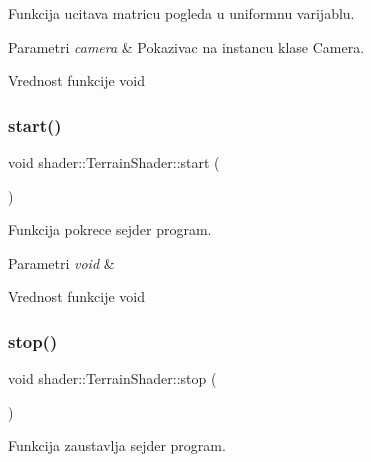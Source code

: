 Funkcija ucitava matricu pogleda u uniformnu varijablu. 


\begin{DoxyParams}{Parametri}
{\em camera} & Pokazivac na instancu klase Camera. \\
\hline
\end{DoxyParams}
\begin{DoxyReturn}{Vrednost funkcije}
void 
\end{DoxyReturn}
\mbox{\label{classshader_1_1TerrainShader_a1a198e23fea4d47a75bf7c1c90216d18}} 
\subsubsection{\texorpdfstring{start()}{start()}}
{\footnotesize\ttfamily void shader\+::\+Terrain\+Shader\+::start (\begin{DoxyParamCaption}\item[{void}]{ }\end{DoxyParamCaption})}



Funkcija pokrece sejder program. 


\begin{DoxyParams}{Parametri}
{\em void} & \\
\hline
\end{DoxyParams}
\begin{DoxyReturn}{Vrednost funkcije}
void 
\end{DoxyReturn}
\mbox{\label{classshader_1_1TerrainShader_acee0c1d3730febbd229b5eee94696829}} 
\subsubsection{\texorpdfstring{stop()}{stop()}}
{\footnotesize\ttfamily void shader\+::\+Terrain\+Shader\+::stop (\begin{DoxyParamCaption}\item[{void}]{ }\end{DoxyParamCaption})}



Funkcija zaustavlja sejder program. 


